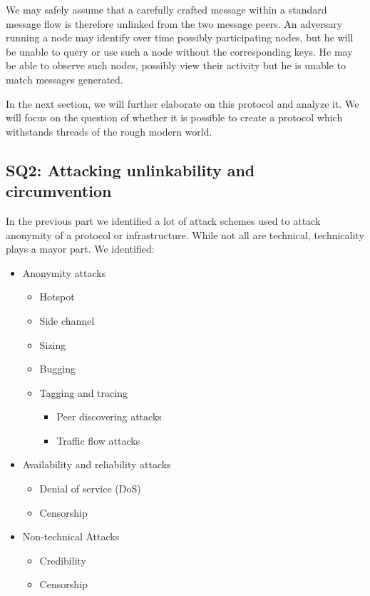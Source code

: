 We may safely assume that a carefully crafted message within a standard message flow is therefore unlinked from the two message peers. An adversary running a node may identify over time possibly participating nodes, but he will be unable to query or use such a node without the corresponding keys. He may be able to observe such nodes, possibly view their activity but he is unable to match messages generated.

In the next section, we will further elaborate on this protocol and analyze it. We will focus on the question of whether it is possible to create a protocol which withstands threads of the rough modern world.

\subsection{SQ2: Attacking unlinkability and circumvention}
In the previous part we identified a lot of attack schemes used to attack anonymity of a protocol or infrastructure. While not all are technical, technicality plays a mayor part. We identified:
\begin{itemize}
	\item Anonymity attacks
	\begin{itemize}
		\item Hotspot
		\item Side channel
		\item Sizing
		\item Bugging
		\item Tagging and tracing
		\begin{itemize}
			\item Peer discovering attacks
			\item Traffic flow attacks
		\end{itemize}
	\end{itemize}
	\item Availability and reliability attacks
	\begin{itemize}
		\item Denial of service (DoS)
		\item Censorship
	\end{itemize}
	\item Non-technical Attacks
	\begin{itemize}
		\item Credibility
		\item Censorship
	\end{itemize}
\end{itemize}


